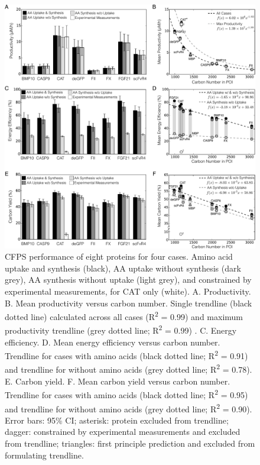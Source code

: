 \documentclass[journal=asbcd6,manuscript=article]{achemso}
\begin{document}
\begin{figure}[t!]
\centering
\includegraphics[width=1.00\textwidth]{./figs/Fig-2-Performance.pdf}
\caption{CFPS performance of eight proteins for four cases. Amino acid uptake and synthesis (black), AA uptake without synthesis (dark grey), AA synthesis without uptake (light grey), and constrained by experimental measurements, for CAT only (white). A. Productivity. B. Mean productivity versus carbon number. Single trendline (black dotted line) calculated across all cases (R\textsuperscript{2} = 0.99) and maximum productivity trendline (grey dotted line; R\textsuperscript{2} = 0.99) .
C. Energy efficiency. D. Mean energy efficiency versus carbon number. Trendline for cases with amino acids (black dotted line; R\textsuperscript{2} = 0.91) and trendline for without amino acids (grey dotted line; R\textsuperscript{2} = 0.78).
E. Carbon yield. F. Mean carbon yield versus carbon number. Trendline for cases with amino acids (black dotted line; R\textsuperscript{2} = 0.95) and trendline for without amino acids (grey dotted line; R\textsuperscript{2} = 0.90).
Error bars: 95\% CI; asterisk: protein excluded from trendline; dagger: constrained by experimental measurements and excluded from trendline; triangles: first principle prediction and excluded from formulating trendline.}
\label{fig:Prof}
\end{figure}
\end{document}
